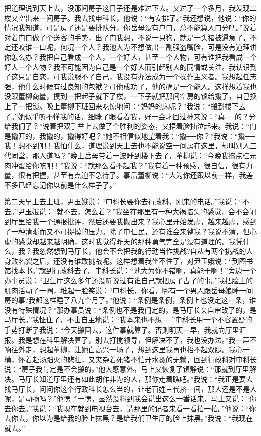 \documentclass[12pt,oneside]{book}
\begin{document}
把道理说到天上去，没那间房子这日子还是难过下去。又过了一个多月，我发现二楼又空出来一间房子。我去找申科长，他说：``有安排了。''我还想说，他说：``你的情况我知道，可是房子还是要排队分，你岳母没有户口，总不能算人口分吧。''说着对着门口做了个送客的手势，出了门我想，不说一只狗，就是一头猪被逼急了，不定还咬谁一口呢，何况一个人？我池大为不想做出一副强盗嘴脸，可是没有道理讲你怎么办？我把自己看成一个人，一个好人，甚至一个人物，可有谁把我看成一个好人一个人物？我不可能因为自己是一个好人而引起别人的同情或关注。我认识到了这只是自恋，可我说服不了自己，我没有办法成为一个操作主义者。我想起任志强，他什么时候有过良知的包袱？可他成功了，他的确是一个能人。这样想着我也没跟董柳商量，摸到一把起子就下了楼，一下子就把那间空房的锁给撬了，自己换上了一把锁。晚上董柳下班回来吃惊地问：``妈妈的床呢？''我说：``搬到楼下去了。''她似乎听不懂我的话，细眯了眼看着我，好一会才回过神来说：``真──的？分给我们了？''说着把双手举上去做了个胜利的姿态，又捂着脸抽泣起来。我说：``门是撬开的，我撬的，撬得好吧？''她不相信似地望着我：``撬──你？''我说：``撬──我！想不到吧！我怕什么，道理说到天上去也不能说空一间房在这里，却叫别人三代同堂，那人道吗？''晚上岳母带着一波睡到楼下去了，董柳说：``今晚我搞点桂元肉冲蛋给你吃吧！''我说：``就那么看不起我？''我有着一种预感，很自信，很有力量，很有把握，甚至有点迫不急待了。事后董柳说：``大为你还跟以前一样，我差不多已经忘记你以前是什么样子了。''

第二天早上去上班，尹玉娥说：``申科长要你去行政科，刚来的电话。''我说：``不去。''尹玉娥说：``就不去，怎么着？''我坐在那里有一种大祸临头的感觉，会不会闹到厅里给我一个通报批评，然后还要我搬出来？我心里开始发虚，越来越虚，感到了一种清晰而又不可捉摸的压力。除了申仁民，还有谁会来整我？我说不清，但心虚的感觉却越来越明确，这时我觉得昨天的那种勇气完全是没有道理的。我凭什么，我？我忽然想到马厅长，他会不会把我的行动当作挑战?自从有两个挑战的人身败名裂之后，还没有谁敢挑战呢。这样想着我坐不住了，对尹玉娥说：``到图书馆找本书。''就到行政科去了。申科长说：``池大为你不错啊，真能干啊！''旁边一个办事员说：``卫生厅这么多年还没听说过有谁自己就把房子占了的事。''我把脸上的肌肉活动了一圈，堆起一脸笑说：``申科长，你看，哪有一个男人跟岳母娘睡一间房的事?我都这样睡了八九个月了。''他说：``条例是条例，条例上也没定这一条，谁没有特殊情况？''那办事员说：``条例也不是我们定的，是马厅长亲自审改了的，是马厅长。''我怔住了，不由自主地说：``我本来也不想──''申科长用一个不容置疑的手势打断了我说：``今天搬回去，这件事就算了。否则明天一早，我就向厅里汇报。我是想在科里解决算了，别去打搅领导，但解决不了，我也没办法。''我一声不响往外走，想起董柳，让她白高兴一场了，想到这里我再也抬不起双腿。我心一横，怀着赴汤蹈火的悲壮，又夹杂着死猪不怕开水烫的无赖，回到行政科对申科长说：``房子我肯定是不会搬的。''他大感意外，马上又恢复了镇静说：``那就到厅里解决。马厅长知道厅里还有如此胡作非为的人，那你走着瞧吧。''我说：``我正是要去找马厅长，问问你这个行政科长怎么当的，让老百姓三代挤一间，那人还是不是人呢，是动物吗？''他愣了一愣，显然没料到我会说出这么一番话来，马上又说：``你去你去。''我说：``我现在就到电视台去，请那里的记者来看一看拍一拍。''他说：``你去你去，你以为是给我的脸上抹黑？是给我们卫生厅的脸上抹黑。''我说：``我现在就去。''
\end{document}

